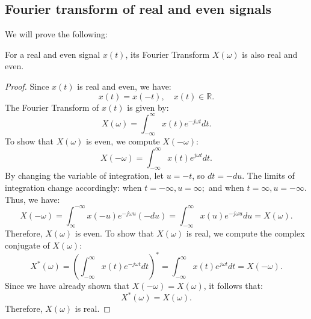 \subsection{Fourier transform of real and even signals}
\label{sec:w9l1-symmetry}
We will prove the following:

\begin{proposition}
    For a real and even signal $x(t)$, its Fourier Transform $X(\omega)$ is also real and even.
    \end{proposition}
\begin{proof}
    Since $x(t)$ is real and even, we have:
    \[
    x(t) = x(-t), \quad x(t) \in \mathbb{R}.
    \]
    The Fourier Transform of $x(t)$ is given by:
    \[
    X(\omega) = \int_{-\infty}^{\infty} x(t) e^{-j \omega t} dt.
    \]
    To show that $X(\omega)$ is even, we compute $X(-\omega)$:
    \[
    X(-\omega) = \int_{-\infty}^{\infty} x(t) e^{j \omega t} dt.
    \]
    By changing the variable of integration, let $u = -t$, so $dt = -du$. The limits of integration change accordingly: when $t = -\infty, u = \infty;$ and when $t = \infty, u = -\infty$. Thus, we have:
    \[
    X(-\omega) = \int_{\infty}^{-\infty} x(-u) e^{-j \omega u} (-du) = \int_{-\infty}^{\infty} x(u) e^{-j \omega u} du = X(\omega).
    \]
    Therefore, $X(\omega)$ is even.
    To show that $X(\omega)$ is real, we compute the complex conjugate of $X(\omega)$:
    \[
    X^*(\omega) = \left( \int_{-\infty}^{\infty} x(t) e^{-j \omega t} dt \right)^* = \int_{-\infty}^{\infty} x(t) e^{j \omega t} dt = X(-\omega).
    \]
    Since we have already shown that $X(-\omega) = X(\omega)$, it follows that:
    \[
    X^*(\omega) = X(\omega).
    \]
    Therefore, $X(\omega)$ is real.
    \end{proof}

